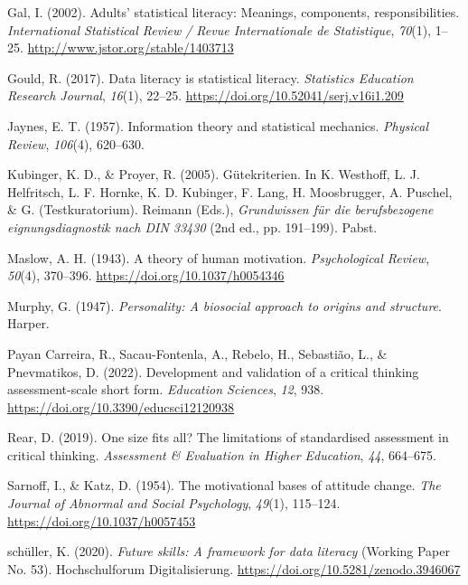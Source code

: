 \documentclass[
  12pt,
  a4paper,
  twoside]{article}
\newlength{\cslhangindent}
\newenvironment{CSLReferences}[2] %
 {\begin{list}{}{%
  \setlength{\itemindent}{0pt}
  \setlength{\leftmargin}{0pt}
  \setlength{\parsep}{0pt}
  \ifodd #1
   \setlength{\leftmargin}{\cslhangindent}
   \setlength{\itemindent}{-1\cslhangindent}
  \fi
  \setlength{\itemsep}{#2\baselineskip}}}
 {\end{list}}
\begin{document}
\begin{CSLReferences}{1}{0}
Gal, I. (2002). Adults' statistical literacy: Meanings, components,
responsibilities. \emph{International Statistical Review / Revue
Internationale de Statistique}, \emph{70}(1), 1--25.
\url{http://www.jstor.org/stable/1403713}

Gould, R. (2017). Data literacy is statistical literacy.
\emph{Statistics Education Research Journal}, \emph{16}(1), 22--25.
\url{https://doi.org/10.52041/serj.v16i1.209}

Jaynes, E. T. (1957). Information theory and statistical mechanics.
\emph{Physical Review}, \emph{106}(4), 620--630.

Kubinger, K. D., \& Proyer, R. (2005). Gütekriterien. In K. Westhoff, L.
J. Helfritsch, L. F. Hornke, K. D. Kubinger, F. Lang, H. Moosbrugger, A.
Puschel, \& G. (Testkuratorium). Reimann (Eds.), \emph{Grundwissen für
die berufsbezogene eignungsdiagnostik nach DIN 33430} (2nd ed., pp.
191--199). Pabst.

Maslow, A. H. (1943). A theory of human motivation. \emph{Psychological
Review}, \emph{50}(4), 370--396. \url{https://doi.org/10.1037/h0054346}

Murphy, G. (1947). \emph{Personality: A biosocial approach to origins
and structure}. Harper.

Payan Carreira, R., Sacau-Fontenla, A., Rebelo, H., Sebastião, L., \&
Pnevmatikos, D. (2022). Development and validation of a critical
thinking assessment-scale short form. \emph{Education Sciences},
\emph{12}, 938. \url{https://doi.org/10.3390/educsci12120938}

Rear, D. (2019). One size fits all? The limitations of standardised
assessment in critical thinking. \emph{Assessment \& Evaluation in
Higher Education}, \emph{44}, 664--675.

Sarnoff, I., \& Katz, D. (1954). The motivational bases of attitude
change. \emph{The Journal of Abnormal and Social Psychology},
\emph{49}(1), 115--124. \url{https://doi.org/10.1037/h0057453}

schüller, K. (2020). \emph{Future skills: A framework for data literacy}
(Working Paper No. 53). Hochschulforum Digitalisierung.
\url{https://doi.org/10.5281/zenodo.3946067}


\end{CSLReferences}
\end{document}
